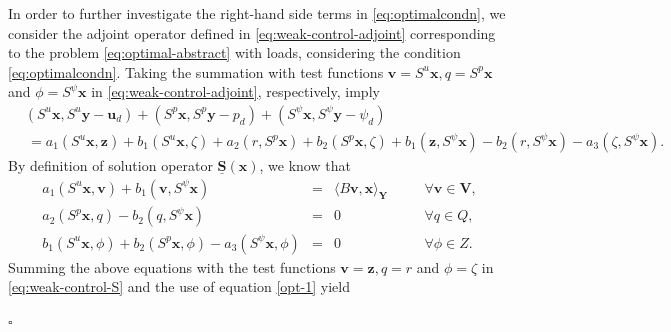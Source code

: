\documentclass[smallextended]{svjour3}
\renewenvironment{proof}{\noindent{\it Proof.}}{\hfill$\square$}
\numberwithin{equation}{section}
\numberwithin{figure}{section}
\numberwithin{table}{section}
\newcommand{\buS}{\underline{\boldsymbol{S}}}
\newcommand\bV{\mathbf{V}}
\newcommand\bx{\boldsymbol{x}}
\newcommand\by{\boldsymbol{y}}
\newcommand\bu{\boldsymbol{u}}
\newcommand\bv{\boldsymbol{v}}
\newcommand\bz{\boldsymbol{z}}
\newcommand{\bY}{\boldsymbol{Y}}
\begin{document}
\begin{proof}
		In order to further investigate the right-hand side terms in \eqref{eq:optimalcondn}, we consider the adjoint operator defined in \eqref{eq:weak-control-adjoint} corresponding to the problem \eqref{eq:optimal-abstract} with loads, considering the condition \eqref{eq:optimalcondn}. 
		Taking the summation with test functions $\bv= S^u \bx, q = S^p \bx$ and $\phi=S^\psi \bx$
        in \eqref{eq:weak-control-adjoint}, respectively, imply
		\begin{equation}\label{opt-1}
		\begin{aligned}
			&(S^u \bx, S^u \by - \bu_d) + (S^p \bx, S^p \by - p_d)  + (S^\psi \bx, S^\psi \by - \psi_d) \\
			& \,= a_1(S^u \bx, \bz) + b_1(S^u \bx, \zeta) + a_2(r, S^p \bx) +  b_2(S^p \bx, \zeta)+
			b_1(\bz, S^\psi \bx)    -  b_2(r,S^\psi \bx)- a_3(\zeta, S^\psi \bx). 
		\end{aligned}
	\end{equation}
	By definition of solution operator $\buS (\bx)$, we know that
		\begin{subequations} \label{eq:weak-control-S}
			\begin{alignat}{6}
				a_1( S^u \bx, \bv) +  b_1(\bv,  S^\psi \bx)    &=& \langle B \bv, \bx \rangle_{\bY}  &\quad&\forall \bv \in \bV,\\
				a_2(S^p \bx,q) - b_2(q,S^\psi \bx) &=& 0 \qquad&\quad&\forall q \in Q,  \\
				b_1(S^u \bx, \phi)  +  b_2(S^p \bx, \phi) -  a_3(S^\psi \bx, \phi)  &=& 0 \qquad    &\quad&\forall \phi \in Z.
			\end{alignat}
		\end{subequations}
		Summing the above equations with the test functions $\bv= \bz, q = r$ and $\phi=\zeta$ in \eqref{eq:weak-control-S}
        and the use of equation \eqref{opt-1} yield

\end{proof}
\end{document}
